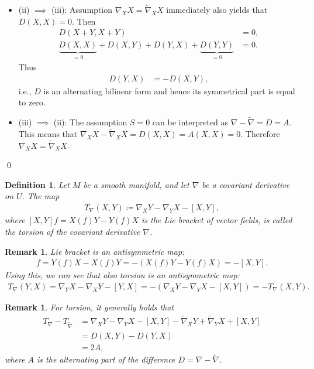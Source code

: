 \documentclass[11pt,a4paper,twoside,openany]{report}
\theoremstyle{my-theorem}
\theoremstyle{non-theorem}
\newtheorem{definition}[theorem]{Definition}
\newtheorem{remark}[theorem]{Remark}
\renewenvironment{proof}[1][\proofname]{{\scshape #1. }}{\qed}
\begin{document}
\begin{proof}
\begin{itemize}
					\item (ii) $\implies$ (iii): Assumption $\nabla_XX = \tilde\nabla_XX$ immediately also yields that $D(X,X) = 0$. Then
					\begin{align*}
						D(X+Y,X+Y) &= 0,
					\\
						\underbrace{D(X,X)}_{=0} + D(X,Y) + D(Y,X) + \underbrace{D(Y,Y)}_{=0} &= 0.
					\end{align*}
					Thus
					\begin{align*}
						D(Y,X) &= -D(X,Y),
					\end{align*}
					i.e., $D$ is an alternating bilinear form and hence its symmetrical part is equal to zero.
					
					\item (iii) $\implies$ (ii): The assumption $S = 0$ can be interpreted as $\nabla - \tilde\nabla = D = A$. This means that $\nabla_XX - \tilde\nabla_XX = D(X,X) = A(X,X) = 0$. Therefore $\nabla_XX = \tilde\nabla_XX$.
				\end{itemize}
			\end{proof}
		
			\begin{definition}
				Let $M$ be a smooth manifold, and let $\nabla$ be a covariant derivative on $U$. The map
				\begin{align*}
					T_\nabla(X,Y) \coloneqq \nabla_XY - \nabla_YX - [X,Y], 
				\end{align*}
				where $[X,Y]f = X(f) Y - Y(f) X$ is the \emph{Lie bracket} of vector fields, is called the \emph{torsion} of the covariant derivative $\nabla$.
			\end{definition}
		
			\begin{remark}
				\label{remark:torsion-and-lie-bracket-are-antisymmetric}
				Lie bracket is an antisymmetric map:
				\begin{align*}
					[Y,X]f = Y(f)X - X(f)Y = -(X(f)Y - Y(f)X) = -[X,Y].
				\end{align*}
				Using this, we can see that also torsion is an antisymmetric map:
				\begin{align*}
					T_\nabla(Y,X) = \nabla_YX - \nabla_XY - [Y,X] = -(\nabla_XY - \nabla_YX - [X,Y]) = -T_\nabla(X,Y).
				\end{align*}
			\end{remark}
		
			\begin{remark}
				For torsion, it generally holds that
				\begin{align*}
					T_\nabla - T_{\tilde\nabla} &= \nabla_XY - \nabla_YX - [X,Y] - \tilde\nabla_XY + \tilde\nabla_YX + [X,Y]
				\\
					&= D(X,Y) - D(Y,X)
				\\
					&= 2A,
				\end{align*}
				where $A$ is the alternating part of the difference $D = \nabla - \tilde\nabla$.
			\end{remark}
		
\end{document}
